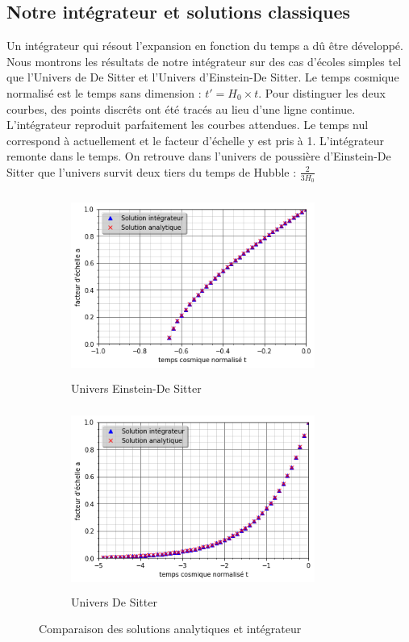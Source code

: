 \documentclass[10pt, a4paper]{report}
\numberwithin{equation}{subsection}
\begin{document}
\subsection{Notre intégrateur et solutions classiques}
Un intégrateur qui résout l'expansion en fonction du temps a dû être développé. Nous montrons les résultats de notre intégrateur sur des cas d'écoles simples tel que l'Univers de De Sitter et l'Univers d'Einstein-De Sitter. Le temps cosmique normalisé est le temps sans dimension : $t' = H_0 \times t$. Pour distinguer les deux courbes, des points discrêts ont été tracés au lieu d'une ligne continue. L'intégrateur reproduit parfaitement les courbes attendues. Le temps nul correspond à actuellement et le facteur d'échelle y est pris à 1. L'intégrateur remonte dans le temps. On retrouve dans l'univers de poussière d'Einstein-De Sitter que l'univers survit deux tiers du temps de Hubble : $\frac{2}{3H_0}$ 

\begin{figure}[h]

\begin{subfigure}{0.5\textwidth}
\includegraphics[width=8.0cm,height=6cm]{EDSf.png}
\caption{Univers Einstein-De Sitter}
\label{fig:UEDS}
\end{subfigure}
\begin{subfigure}{0.5\textwidth}
\includegraphics[width=8.0cm,height=6cm]{DSf.png}
\caption{Univers De Sitter}
\label{fig:UDS}
\end{subfigure}

\caption{Comparaison des solutions analytiques et intégrateur}
\label{fig:UISC}
\end{figure}
\end{document}
